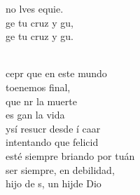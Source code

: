 \begin{cancion}
\begin{chorus}
	no lves equie. \\
	ge tu cruz y gu, \\
	ge tu cruz y gu. \\
	\end{chorus}%
	\jump\\
	cepr que en este mundo \\
	toenemos final, \\
	que nr la muerte \\
	es gan la vida  \\
	ysí resucr desde í caar\\
	intentando que  felicid\\
	esté siempre briando por tuán\\
	 ser siempre, en debilidad, \\
	 hijo de s, un hijde Dio\\
\end{cancion}%
